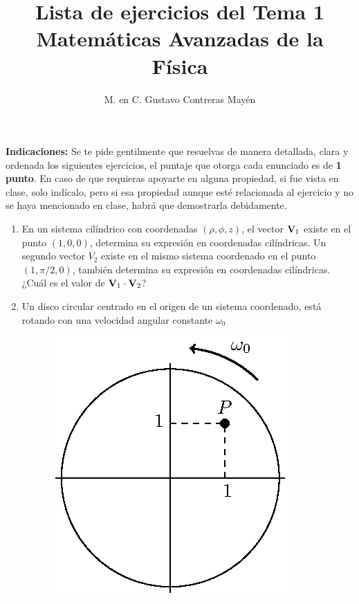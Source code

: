 \documentclass[hidelinks,12pt]{article}
\title{Lista de ejercicios del Tema 1 \\[0.3em]  \large{Matemáticas Avanzadas de la Física}\vspace{-3ex}}
\author{M. en C. Gustavo Contreras Mayén}
\date{ }
\begin{document}
\vspace{-4cm}
\maketitle

\fontsize{14}{14}\selectfont

\textbf{Indicaciones: } Se te pide gentilmente que resuelvas de manera detallada, clara y ordenada los siguientes ejercicios, el puntaje que otorga cada enunciado es de \textbf{1 punto}. En caso de que requieras apoyarte en alguna propiedad, si fue vista en clase, solo indícalo, pero si esa propiedad aunque esté relacionada al ejercicio y no se haya mencionado en clase, habrá que demostrarla debidamente.

\begin{enumerate}
\item En un sistema cilíndrico con coordenadas $(\rho, \phi, z)$, el vector $\vb{V}_{1}$ existe en el punto $(1, 0, 0)$, determina su expresión en coordenadas cilíndricas. Un segundo vector $V_{2}$ existe en el mismo sistema coordenado en el punto $(1, \pi/2, 0)$, también determina su expresión en coordenadas cilíndricas. ¿Cuál es el valor de $\vb{V}_{1} \cdot \vb{V}_{2}$?
\item Un disco circular centrado en el origen de un sistema coordenado, está rotando con una velocidad angular constante $\omega_{0}$
\begin{figure}[H]
    \centering
    \includegraphics[scale=1]{Imagenes/Ejercicio_Disco_Rotando_01.eps}
\end{figure}

\end{enumerate}
\end{document}
